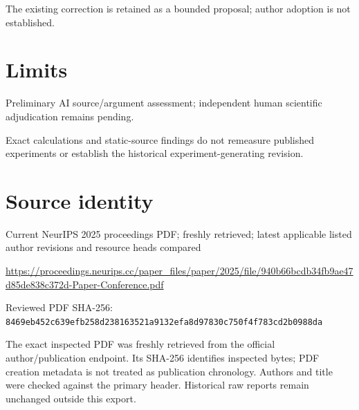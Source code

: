 \documentclass[11pt]{article}
\begin{document}
The existing correction is retained as a bounded proposal; author adoption is not established.

\section*{Limits}

Preliminary AI source/argument assessment; independent human scientific adjudication remains pending.\par

Exact calculations and static-source findings do not remeasure published experiments or establish the historical experiment-generating revision.\par

\section*{Source identity}

Current NeurIPS 2025 proceedings PDF; freshly retrieved; latest applicable listed author revisions and resource heads compared

\url{https://proceedings.neurips.cc/paper_files/paper/2025/file/940b66bcdb34fb9ae47d85de838c372d-Paper-Conference.pdf}

Reviewed PDF SHA-256: \nolinkurl{8469eb452c639efb258d238163521a9132efa8d97830c750f4f783cd2b0988da}

The exact inspected PDF was freshly retrieved from the official author/publication endpoint. Its SHA-256 identifies inspected bytes; PDF creation metadata is not treated as publication chronology. Authors and title were checked against the primary header. Historical raw reports remain unchanged outside this export.
\end{document}
